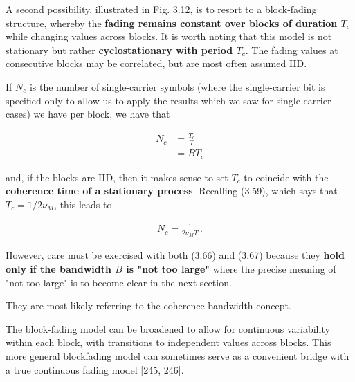 \documentclass[a4paper, 12pt]{book}
\begin{document}
A second possibility, illustrated in Fig. 3.12, is to resort to a block-fading structure, whereby the \textbf{fading remains constant over blocks of duration $T_c$} while changing values across blocks. It is worth noting that this model is not stationary but rather \textbf{cyclostationary with period $T_c$}. The fading values at consecutive blocks may be correlated, but are most often assumed IID.

\begin{center}
\end{center}

If $N_c$ is the number of single-carrier symbols (where the single-carrier bit is specified only to allow us to apply the results which we saw for single carrier cases) we have per block, we have that

\begin{align}
N_c &= \frac{T_c}{T} \tag{3.65} \\
&= B T_c \tag{3.66}
\end{align}

and, if the blocks are IID, then it makes sense to set $T_c$ to coincide with the \textbf{coherence time of a stationary process}. Recalling (3.59), which says that $T_c = 1/2\nu_M$, this leads to

\begin{align}
N_c = \frac{1}{2 \nu_M T} \,. \tag{3.67}
\end{align}

\begin{yellowbox}
However, care must be exercised with both (3.66) and (3.67) because they \textbf{hold only if the bandwidth $B$ is "not too large"} where the precise meaning of "not too large" is to become clear in the next section.

\begin{greenbar}
They are most likely referring to the coherence bandwidth concept.
\end{greenbar}

The block-fading model can be broadened to allow for continuous variability within each block, with transitions to independent values across blocks. This more general blockfading model can sometimes serve as a convenient bridge with a true continuous fading model [245, 246].
\end{yellowbox}
\end{document}
